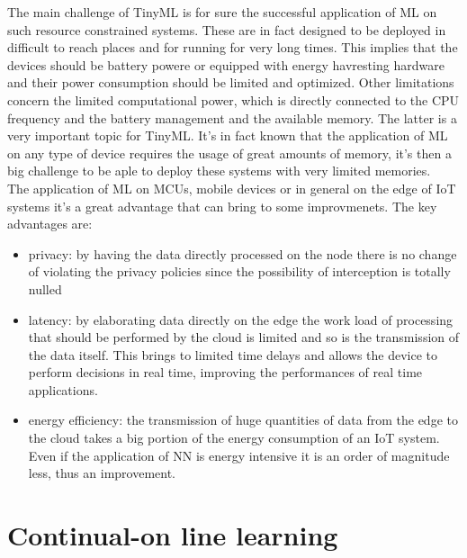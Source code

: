 \documentclass[12pt]{report}
\begin{document}
The main challenge of TinyML is for sure the successful application of ML on such resource constrained systems. These are in fact designed to be deployed in difficult to reach places and for running for very long times. This implies that the devices should be battery powere or equipped with energy havresting hardware and their power consumption should be limited and optimized. Other limitations concern the limited computational power, which is directly connected to the CPU frequency and the battery management and the available memory. The latter is a very important topic for TinyML. It's in fact known that the application of ML on any type of device requires the usage of great amounts of memory, it's then a big challenge to be aple to deploy these systems with very limited memories.\\
The application of ML on MCUs, mobile devices or in general on the edge of IoT systems it's a great advantage that can bring to some improvmenets. The key advantages are:
\begin{itemize}
\item privacy: by having the data directly processed on the node there is no change of violating the privacy policies since the possibility of interception is totally nulled
\item latency: by elaborating data directly on the edge the work load of processing that should be performed by the cloud is limited and so is the transmission of the data itself. This brings to limited time delays and allows the device to perform decisions in real time, improving the performances of real time applications.
\item energy efficiency: the transmission of huge quantities of data from the edge to the cloud takes a big portion of the energy consumption of an IoT system. Even if the application of NN is energy intensive it is an order of magnitude less, thus an improvement.
\end{itemize}


\section{Continual-on line learning}
\end{document}
